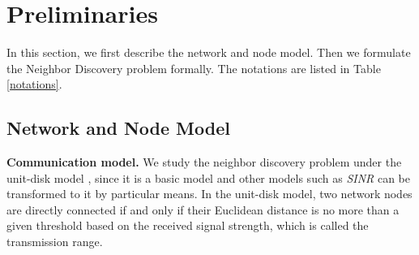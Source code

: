 \section{Preliminaries}
\label{sectionmodel}

In this section, we first describe the network and node model.
Then we formulate the Neighbor Discovery problem formally. 
The notations are listed in Table \ref{notations}.

\begin{table}[!t]
\renewcommand{\arraystretch}{1.3}
\caption{Notations for Neighbor Discovery}
\label{notations}
\centering
{}
\end{table}


\subsection{Network and Node Model}

\textbf{Communication model.} 
We study the neighbor discovery 
problem under the unit-disk model \cite{moscibroda2006complexity, wang2015connectivity}, 
since it is a basic model and other models such as \emph{SINR} can be transformed to 
it by particular means. %
In the unit-disk model, two network nodes are directly connected if and only 
if their Euclidean distance is no more than a given threshold based on the received signal strength, 
which is called the transmission range.

